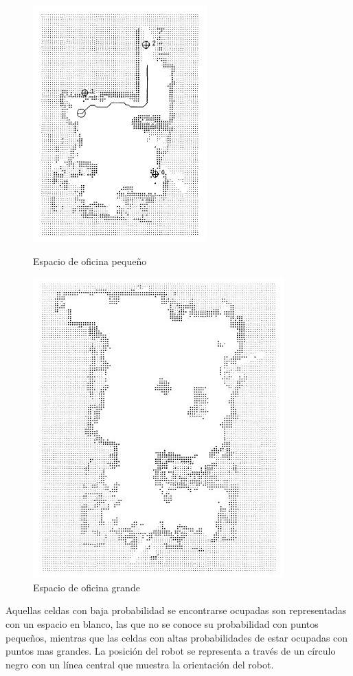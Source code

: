 \documentclass[12pt]{article}
\begin{document}
\begin{figure}[ht]
	\centering
	\begin{minipage}[b]{0.45\linewidth}
		\includegraphics{images/small_office.JPG}
		\caption{Espacio de oficina pequeño}
		\label{fig:small_office_map}
	\end{minipage}
	\quad
	\begin{minipage}[b]{0.45\linewidth}
		\includegraphics{images/large_office.JPG}
		\caption{Espacio de oficina grande}
		\label{fig:large_office_map}
	\end{minipage}
\end{figure}

Aquellas celdas con baja probabilidad se encontrarse ocupadas son representadas con un espacio en blanco, las que no se conoce su probabilidad con puntos pequeños, mientras que las celdas con altas probabilidades de estar ocupadas con puntos mas grandes. La posición del robot se representa a través de un círculo negro con un línea central que muestra la orientación del robot.
\end{document}
